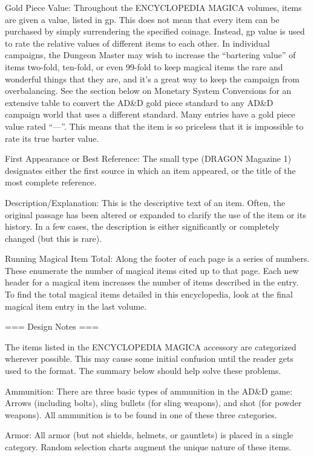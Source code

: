 Gold Piece Value: Throughout the ENCYCLOPEDIA MAGICA volumes, items are given a value, listed in gp. This does not mean that every item can be purchased by simply surrendering the specified coinage. Instead, gp value is used to rate the relative values of different items to each other. In individual campaigns, the Dungeon Master may wish to increase the “bartering value” of items two-fold, ten-fold, or even 99-fold to keep magical items the rare and wonderful things that they are, and it’s a great way to keep the campaign from overbalancing. See the section below on Monetary System Conversions for an extensive table to convert the AD&D gold piece standard to any AD&D campaign world that uses a different standard. Many entries have a gold piece value rated “—”. This means that the item is so priceless that it is impossible to rate its true barter value.

First Appearance or Best Reference: The small type (DRAGON Magazine 1) designates either the first source in which an item appeared, or the title of the most complete reference.

Description/Explanation: This is the descriptive text of an item. Often, the original passage has been altered or expanded to clarify the use of the item or its history. In a few cases, the description is either significantly or completely changed (but this is rare).

Running Magical Item Total: Along the footer of each page is a series of numbers. These enumerate the number of magical items cited up to that page. Each new header for a magical item increases the number of items described in the entry. To find the total magical items detailed in this encyclopedia, look at the final magical item entry in the last volume.

=== Design Notes ===

The items listed in the ENCYCLOPEDIA MAGICA accessory are categorized wherever possible. This may cause some initial confusion until the reader gets used to the format. The summary below should help solve these problems.

Ammunition: There are three basic types of ammunition in the AD&D game: Arrows (including bolts), sling bullets (for sling weapons), and shot (for powder weapons). All ammunition is to be found in one of these three categories.

Armor: All armor (but not shields, helmets, or gauntlets) is placed in a single category. Random selection charts augment the unique nature of these items.

